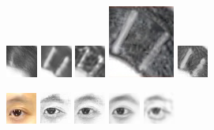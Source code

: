 \documentclass[10pt,twocolumn,letterpaper]{article}
\begin{document}
\begin{figure}[t]
\begin{minipage}[t]{1\linewidth}
\includegraphics[width=0.11\linewidth]{img/hairpin_ssd_patch.png}
\includegraphics[width=0.11\linewidth]{img/hairpin_fcnn_patch.png}
\includegraphics[width=0.11\linewidth]{img/hairpin_bfcn_patch.png}
\includegraphics[width=0.11\linewidth]{img/hairpin_deepart_patch.jpg}
\includegraphics[width=0.11\linewidth]{img/hairpin_ours_patch.png}
\end{minipage}
\begin{minipage}[t]{1\linewidth}
\centering
\includegraphics[width=0.11\linewidth]{img/eye_photo.png}
\includegraphics[width=0.11\linewidth]{img/eye_mrf.png}
\includegraphics[width=0.11\linewidth]{img/eye_wmrf.png}
\includegraphics[width=0.11\linewidth]{img/eye_ssd.png}
\includegraphics[width=0.11\linewidth]{img/eye_fcnn.png}

\end{minipage}
\end{figure}
\end{document}
